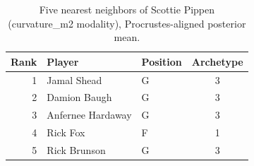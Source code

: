 \begin{table}[htbp]
  \centering\small
  \begin{tabular}{rllc}
    \toprule
    Rank & Player & Position & Archetype \\
    \midrule
    1 & Jamal Shead & G & 3 \\
    2 & Damion Baugh & G & 3 \\
    3 & Anfernee Hardaway & G & 3 \\
    4 & Rick Fox & F & 1 \\
    5 & Rick Brunson & G & 3 \\
    \bottomrule
  \end{tabular}
  \caption{Five nearest neighbors of Scottie Pippen (curvature_m2 modality), Procrustes-aligned posterior mean.}
  \label{tab:Scottie_Pippen_neighbors_curvature_m2}
\end{table}

